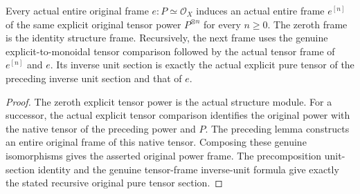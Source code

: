 \begin{definition}\label{def:fc-actual-entire-power-frame}
\leanok
{}
Every actual entire original frame $e:P\simeq\mathcal O_X$
induces an actual entire frame $e^{[n]}$ of the same explicit
original tensor power $P^{\otimes n}$ for every $n\geq0$.
The zeroth frame is the identity structure frame. Recursively,
the next frame uses the genuine explicit-to-monoidal tensor
comparison followed by the actual tensor frame of $e^{[n]}$
and $e$. Its inverse unit section is exactly the actual explicit
pure tensor of the preceding inverse unit section and that of $e$.
\end{definition}
\begin{proof}
The zeroth explicit tensor power is the actual structure module.
For a successor, the actual explicit tensor comparison identifies
the original power with the native tensor of the preceding power
and $P$. The preceding lemma constructs an entire original frame
of this native tensor. Composing these genuine isomorphisms gives
the asserted original power frame. The precomposition unit-section
identity and the genuine tensor-frame inverse-unit formula give
exactly the stated recursive original pure tensor section.
\end{proof}

